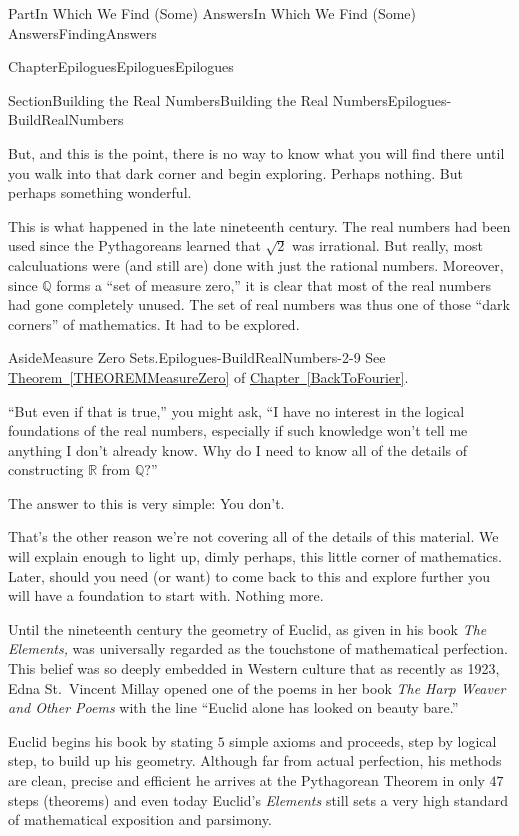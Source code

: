 \documentclass[oneside,10pt,]{book}
\newcommand{\xreffont}{\relax}
\numberwithin{equation}{part}
\newcommand{\RR}{\mathbb {R}}
\newcommand{\QQ}{\mathbb {Q}}
\begin{document}
\begin{partptx}{Part}{In Which We Find (Some) Answers}{}{In Which We Find (Some) Answers}{}{}{FindingAnswers}
\begin{chapterptx}{Chapter}{Epilogues}{}{Epilogues}{}{}{Epilogues}
\begin{sectionptx}{Section}{Building the Real Numbers}{}{Building the Real Numbers}{}{}{Epilogues-BuildRealNumbers}
\begin{introduction}{}
\par
But, and this is the point, there is no way to know what you will find there until you walk into that dark corner and begin exploring.  Perhaps nothing.  But perhaps something wonderful.%
\par
This is what happened in the late nineteenth century.  The real numbers had been used since the Pythagoreans learned that \(\sqrt{2}\) was irrational.  But really, most calculuations were (and still are) done with just the rational numbers. Moreover, since \(\QQ\) forms a ``set of measure zero,''  it is clear that most of the real numbers had gone completely unused. The set of real numbers was thus one of those ``dark corners'' of mathematics. It had to be explored.%
\begin{aside}{Aside}{Measure Zero Sets.}{Epilogues-BuildRealNumbers-2-9}%
See \hyperref[THEOREMMeasureZero]{Theorem~{\xreffont\ref{THEOREMMeasureZero}}} of \hyperref[BackToFourier]{Chapter~{\xreffont\ref{BackToFourier}}}.%
\end{aside}
``But even if that is true,'' you might ask, ``I have no interest in the logical foundations of the real numbers, especially if such knowledge won't tell me anything I don't already know.  Why do I need to know all of the details of constructing \(\RR\) from \(\QQ?\)''%
\par
The answer to this is very simple: You don't.%
\par
That's the other reason we're not covering all of the details of this material.  We will explain enough to light up, dimly perhaps, this little corner of mathematics. Later, should you need (or want) to come back to this and explore further you will have a foundation to start with. Nothing more.%
\par
Until the nineteenth century the geometry of Euclid, as given in his book \emph{The Elements,} was universally regarded as the touchstone of mathematical perfection.  This belief was so deeply embedded in Western culture that as recently as 1923, Edna St.~Vincent Millay opened one of the poems in her book \emph{The Harp Weaver and Other Poems} with the line ``Euclid alone has looked on beauty bare.''%
\par
Euclid begins his book by stating \(5\) simple axioms and proceeds, step by logical step, to build up his geometry.  Although far from actual perfection, his methods are clean, precise and efficient \textemdash{} he arrives at the Pythagorean Theorem in only \(47\) steps (theorems) \textemdash{} and even today Euclid's \emph{Elements} still sets a very high standard of mathematical exposition and parsimony.%

\end{introduction}
\end{sectionptx}
\end{chapterptx}
\end{partptx}
\end{document}
